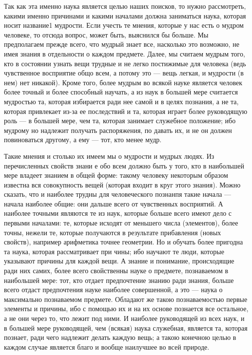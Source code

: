 \documentclass{article}
\begin{document}
Так как эта именно наука является целью наших поисков, то нужно рассмотреть, какими именно причинами и какими началами должна заниматься наука, которая носит название1  мудрости. Если учесть те мнения, которые у нас есть о мудром человеке, то отсюда вопрос, может быть, выяснился бы больше. Мы предполагаем прежде всего, что мудрый знает все, насколько это возможно, не имея знания в отдельности о каждом предмете. Далее, мы считаем мудрым того, кто в состоянии узнать вещи трудные и не легко постижимые для человека (ведь чувственное восприятие общо всем, а потому это --- вещь легкая, и мудрости (в нем) нет никакой). Кроме того, более мудрым во всякой науке является человек более точный и более способный научать, а из наук в большей мере считается мудростью та, которая избирается ради нее самой и в целях познания, а не та, которая привлекает из-за ее последствий и та, которая играет более руководящую роль --- в большей мере, чем та, которая занимает служебное положение; ибо мудрому но надлежит получать распоряжения, по давать их, и не он должен повиноваться другому, а ему --- тот, кто менее мудр.

Такие мнения и столько их имеем мы о мудрости и мудрых людях. Из перечисленных свойств знани е обо всем должно быть у того, кто в наибольшей мере владеет знанием в общей форме: такому человеку некоторым образом
\footnotemark[1]
известна вся совокупность вещей (которая входит в круг этого знания).
\footnotemark[7]
Можно сказать, что и наиболее трудны для человеческого познанпя такие начала --- начала наиболее общие: они дальше всего от чувственных восприятий. А наиболее точными являются те из наук, которые больше всего имеют дело с первыми началами: те, которые исходят от меньшего числа (элементов), более точны, нежели те, которые получаются в результате прибавления (новых свойств), например арифметика точнее геометрии.
\footnotemark[2]
Но и обучать более пригодна та наука, которая рассматривает при чины; ибо научают те люди, которые указывают причины для каждой вещи. А знание и понимание, происходящие ради них самих, более всего свойственны науке о предмете, познаваемом в наибольшей мере:
\footnotemark[7]
тот, кто отдает предпочтение знанию ради знания, больше всего отдаст предпочтения науке наиболее совершенной,
\footnotemark[8]
а это --- наука о максимально познаваемом предмете. Обладают же такою познаваемостью первые элементы и причины, ибо с помощью их и на их основе познается все остальное, а не они через то, что лежит под ними.
\footnotemark[5]
И наиболее руководящей из всех наук, и в большей мере руководящей, чем (всякая) наука служебная, является та, которая познает, ради чего надлежит делать каждую вещь; а такою конечною целью в каждом случае является благо и вообще наилучшее во всей природе.
\end{document}
